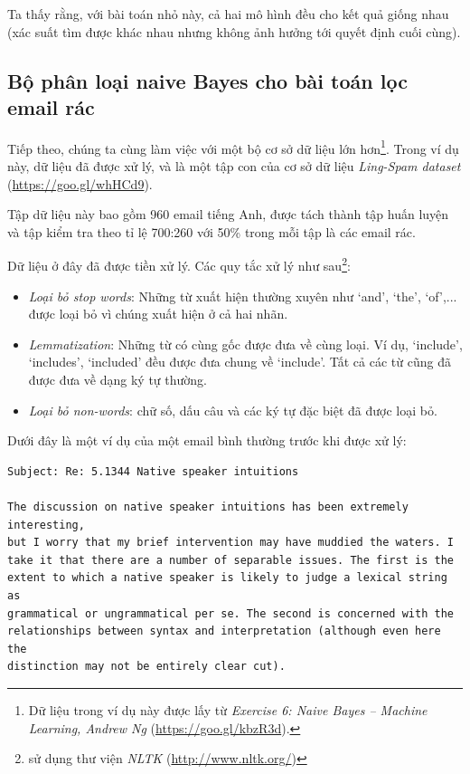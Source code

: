 Ta thấy rằng, với bài toán nhỏ này, cả hai mô hình đều cho kết quả giống nhau (xác suất tìm được khác nhau nhưng không ảnh hưởng tới quyết định cuối cùng).



\subsection{Bộ phân loại naive Bayes cho bài toán lọc email rác}
Tiếp theo, chúng ta cùng làm việc với một bộ cơ sở dữ liệu lớn hơn\footnote{Dữ liệu trong ví dụ này được lấy từ \textit{Exercise 6: Naive Bayes -- Machine Learning, Andrew Ng} (\url{https://goo.gl/kbzR3d}).}. Trong ví dụ này, dữ liệu đã được xử lý, và là một tập con của cơ sở dữ liệu \textit{Ling-Spam dataset} (\url{https://goo.gl/whHCd9}).



Tập dữ liệu này bao gồm 960 email tiếng Anh, được tách thành tập huấn luyện và tập kiểm tra theo tỉ lệ 700:260 với 50\% trong mỗi tập là các email rác.

Dữ liệu ở đây đã được tiền xử lý. Các quy tắc xử lý như sau\footnote{sử dụng thư viện \textit{NLTK}
(\url{http://www.nltk.org/})}:
\begin{itemize}
\item \textit{Loại bỏ \textit{stop words}}: Những từ xuất hiện thường xuyên như `and', `the', `of',... được loại bỏ vì chúng xuất hiện ở cả hai nhãn.

\item \textit{Lemmatization}: Những từ có cùng gốc được đưa về cùng loại. Ví dụ, `include', `includes', `included' đều được đưa chung về `include'. Tất cả các từ cũng đã được đưa về dạng ký tự thường.


\item \textit{Loại bỏ \textit{non-words}}: chữ số, dấu câu và các ký tự đặc biệt đã được loại bỏ.
\end{itemize}



Dưới đây là một ví dụ của một email bình thường {trước khi được xử lý}:

\begin{lstlisting}
Subject: Re: 5.1344 Native speaker intuitions

The discussion on native speaker intuitions has been extremely interesting,
but I worry that my brief intervention may have muddied the waters. I
take it that there are a number of separable issues. The first is the
extent to which a native speaker is likely to judge a lexical string as
grammatical or ungrammatical per se. The second is concerned with the
relationships between syntax and interpretation (although even here the
distinction may not be entirely clear cut). \end{lstlisting}

